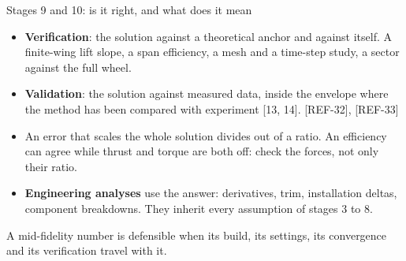 \begin{frame}{Stages 9 and 10: is it right, and what does it mean}
\begin{itemize}\small
  \item \textbf{Verification}: the solution against a theoretical anchor and
        against itself. A finite-wing lift slope, a span efficiency, a mesh
        and a time-step study, a sector against the full wheel.
  \item \textbf{Validation}: the solution against measured data, inside the
        envelope where the method has been compared with experiment
        [13, 14]. [REF-32], [REF-33]
  \item An error that scales the whole solution divides out of a ratio. An
        efficiency can agree while thrust and torque are both off: check the
        forces, not only their ratio.
  \item \textbf{Engineering analyses} use the answer: derivatives, trim,
        installation deltas, component breakdowns. They inherit every
        assumption of stages 3 to 8.
\end{itemize}
\begin{takeaway}A mid-fidelity number is defensible when its build, its
settings, its convergence and its verification travel with it.\end{takeaway}
\end{frame}
